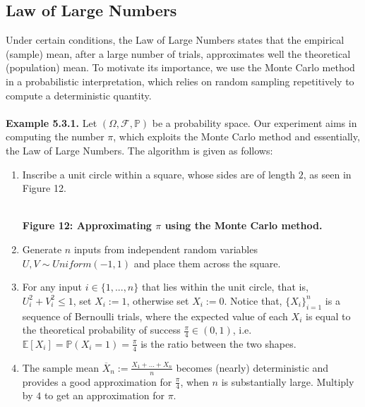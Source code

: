 \documentclass{article}
\begin{document}
\subsection{Law of Large Numbers}
Under certain conditions, the Law of Large Numbers states that the empirical (sample) mean, after a large number of trials, approximates well the theoretical (population) mean. To motivate its importance, we use the Monte Carlo method in a probabilistic interpretation, which relies on random sampling repetitively to compute a deterministic quantity.\\\\
\textbf{Example 5.3.1.} Let $(\Omega,\mathcal{F},\mathbb{P})$ be a probability space. Our experiment aims in computing the number $\pi$, which exploits the Monte Carlo method and essentially, the Law of Large Numbers. The algorithm is given as follows:
\begin{enumerate}
	\item Inscribe a unit circle within a square, whose sides are of length $2$, as seen in Figure 12.
	\begin{center}
	\\
	\textbf{Figure 12: Approximating $\pi$ using the Monte Carlo method.}
	\end{center}
	\item Generate $n$ inputs from independent random variables $U,V \sim Uniform(-1,1)$ and place them across the square.
	\item For any input $i \in \{1,...,n\}$ that lies within the unit circle, that is, $U_i^2 + V_i^2 \leq 1$, set $X_i := 1$, otherwise set $X_i := 0$. Notice that, $\{X_i\}_{i=1}^{n}$ is a sequence of Bernoulli trials, where the expected value of each $X_i$ is equal to the theoretical probability of success $\frac{\pi}{4}\in(0,1)$, i.e. $\mathbb{E}[X_i] = \mathbb{P}(X_i = 1) = \frac{\pi}{4}$ is the ratio between the two shapes.
	\item The sample mean $\overline{X}_n := \frac{X_1 + ... + X_n}{n}$ becomes (nearly) deterministic and provides a good approximation for $\frac{\pi}{4}$, when $n$ is substantially large. Multiply by $4$ to get an approximation for $\pi$.
\end{enumerate}
\end{document}
